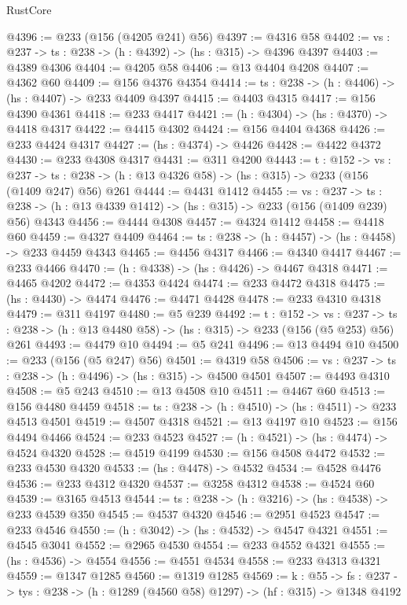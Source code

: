 \begin{lexlean}{RustCore}
\begin{coremodule}
@4396 := @233 (@156 (@4205 @241) @56)
@4397 := @4316 @58
@4402 := {vs : @237} -> {ts : @238} -> (h : @4392) -> (hs : @315) -> @4396 @4397
@4403 := @4389 @4306
@4404 := @4205 @58
@4406 := @13 @4404 @4208
@4407 := @4362 @60
@4409 := @156 @4376 @4354
@4414 := {ts : @238} -> (h : @4406) -> (hs : @4407) -> @233 @4409 @4397
@4415 := @4403 @4315
@4417 := @156 @4390 @4361
@4418 := @233 @4417
@4421 := (h : @4304) -> (hs : @4370) -> @4418 @4317
@4422 := @4415 @4302
@4424 := @156 @4404 @4368
@4426 := @233 @4424 @4317
@4427 := (hs : @4374) -> @4426
@4428 := @4422 @4372
@4430 := @233 @4308 @4317
@4431 := @311 @4200
@4443 := {t : @152} ->
  {vs : @237} ->
  {ts : @238} -> (h : @13 @4326 @58) -> (hs : @315) -> @233 (@156 (@1409 @247) @56) @261
@4444 := @4431 @1412
@4455 := {vs : @237} ->
  {ts : @238} -> (h : @13 @4339 @1412) -> (hs : @315) -> @233 (@156 (@1409 @239) @56) @4343
@4456 := @4444 @4308
@4457 := @4324 @1412
@4458 := @4418 @60
@4459 := @4327 @4409
@4464 := {ts : @238} -> (h : @4457) -> (hs : @4458) -> @233 @4459 @4343
@4465 := @4456 @4317
@4466 := @4340 @4417
@4467 := @233 @4466
@4470 := (h : @4338) -> (hs : @4426) -> @4467 @4318
@4471 := @4465 @4202
@4472 := @4353 @4424
@4474 := @233 @4472 @4318
@4475 := (hs : @4430) -> @4474
@4476 := @4471 @4428
@4478 := @233 @4310 @4318
@4479 := @311 @4197
@4480 := @5 @239
@4492 := {t : @152} ->
  {vs : @237} -> {ts : @238} -> (h : @13 @4480 @58) -> (hs : @315) -> @233 (@156 (@5 @253) @56) @261
@4493 := @4479 @10
@4494 := @5 @241
@4496 := @13 @4494 @10
@4500 := @233 (@156 (@5 @247) @56)
@4501 := @4319 @58
@4506 := {vs : @237} -> {ts : @238} -> (h : @4496) -> (hs : @315) -> @4500 @4501
@4507 := @4493 @4310
@4508 := @5 @243
@4510 := @13 @4508 @10
@4511 := @4467 @60
@4513 := @156 @4480 @4459
@4518 := {ts : @238} -> (h : @4510) -> (hs : @4511) -> @233 @4513 @4501
@4519 := @4507 @4318
@4521 := @13 @4197 @10
@4523 := @156 @4494 @4466
@4524 := @233 @4523
@4527 := (h : @4521) -> (hs : @4474) -> @4524 @4320
@4528 := @4519 @4199
@4530 := @156 @4508 @4472
@4532 := @233 @4530 @4320
@4533 := (hs : @4478) -> @4532
@4534 := @4528 @4476
@4536 := @233 @4312 @4320
@4537 := @3258 @4312
@4538 := @4524 @60
@4539 := @3165 @4513
@4544 := {ts : @238} -> (h : @3216) -> (hs : @4538) -> @233 @4539 @350
@4545 := @4537 @4320
@4546 := @2951 @4523
@4547 := @233 @4546
@4550 := (h : @3042) -> (hs : @4532) -> @4547 @4321
@4551 := @4545 @3041
@4552 := @2965 @4530
@4554 := @233 @4552 @4321
@4555 := (hs : @4536) -> @4554
@4556 := @4551 @4534
@4558 := @233 @4313 @4321
@4559 := @1347 @1285
@4560 := @1319 @1285
@4569 := {k : @55} ->
  {fs : @237} -> {tys : @238} -> (h : @1289 (@4560 @58) @1297) -> (hf : @315) -> @1348 @4192

\end{coremodule}
\end{lexlean}
